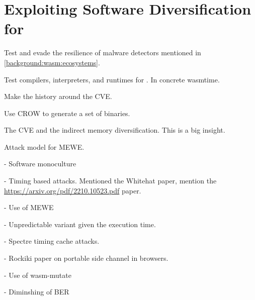 \chapter{Exploiting Software Diversification for \Wasm}
\label{method}




Test and evade the resilience of \Wasm malware detectors mentioned in \autoref{background:wasm:ecosystems}.









Test compilers, interpreters, and runtimes for \Wasm.
In concrete wasmtime.

Make the history around the CVE.



Use CROW to generate a set of \wasm binaries.


The CVE and the indirect memory diversification.
This is a big insight.

\label{usecasetime}

 Attack model for MEWE.


- Software monoculture

- Timing based attacks. Mentioned the Whitehat paper, mention the \url{https://arxiv.org/pdf/2210.10523.pdf} paper. 



- Use of MEWE




- Unpredictable variant given the execution time.





- Spectre timing cache attacks.

- Rockiki paper on portable side channel in browsers.



- Use of wasm-mutate


- Diminshing of BER